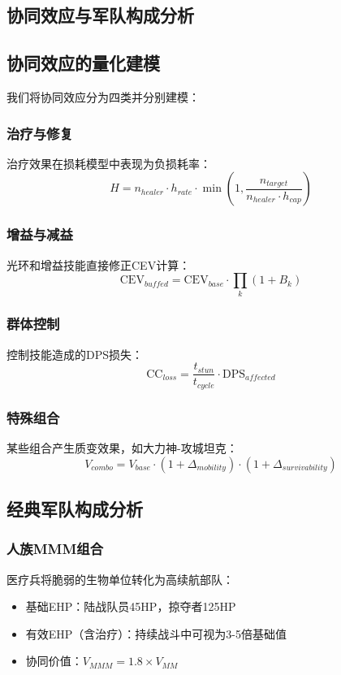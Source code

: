 \documentclass[a4paper,12pt]{article}
\begin{document}
\begin{CJK}{UTF8}{gbsn}
\section{协同效应与军队构成分析}

\subsection{协同效应的量化建模}
我们将协同效应分为四类并分别建模：

\subsubsection{治疗与修复}
治疗效果在损耗模型中表现为负损耗率：
\begin{equation}
H = n_{healer} \cdot h_{rate} \cdot \min(1, \frac{n_{target}}{n_{healer} \cdot h_{cap}})
\end{equation}

\subsubsection{增益与减益}
光环和增益技能直接修正CEV计算：
\begin{equation}
\text{CEV}_{buffed} = \text{CEV}_{base} \cdot \prod_k (1 + B_k)
\end{equation}

\subsubsection{群体控制}
控制技能造成的DPS损失：
\begin{equation}
\text{CC}_{loss} = \frac{t_{stun}}{t_{cycle}} \cdot \text{DPS}_{affected}
\end{equation}

\subsubsection{特殊组合}
某些组合产生质变效果，如大力神-攻城坦克：
\begin{equation}
V_{combo} = V_{base} \cdot (1 + \Delta_{mobility}) \cdot (1 + \Delta_{survivability})
\end{equation}

\subsection{经典军队构成分析}

\subsubsection{人族MMM组合}
医疗兵将脆弱的生物单位转化为高续航部队：
\begin{itemize}
\item 基础EHP：陆战队员45HP，掠夺者125HP
\item 有效EHP（含治疗）：持续战斗中可视为3-5倍基础值
\item 协同价值：$V_{MMM} = 1.8 \times V_{MM}$
\end{itemize}


\end{CJK}
\end{document}
